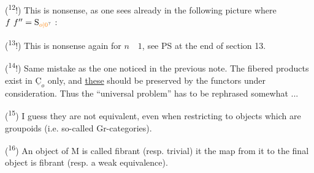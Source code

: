 \noindent\hspace*{1em}\par
\noindent\hspace*{1em}\par
\noindent\hspace*{1em}\par
\noindent\hspace*{1em}\par
\noindent\hspace*{1em}\par
\noindent\hspace*{1em}\par
\noindent\hspace*{1em}\par
\noindent\hspace*{1em}\par
\noindent\hspace*{1em}\par

(\textsuperscript{12}!) This is nonsense, as one sees already in the following picture where $f\ f''=\mathrm{S}_{\unsure{o|0}}$ :

(\textsuperscript{13}!) This is nonsense again for $n\quad 1$, see PS at the end of section 13.

(\textsuperscript{14}!) Same mistake as  the one noticed in the previous note. The fibered products exist in $\underline{\mathrm{C}}_{o}$ only, and \uline{these} should be preserved by the functors under consideration. Thus the ``universal problem'' has to be rephrased somewhat ...

(\textsuperscript{15}) I guess they are not equivalent, even when restricting to objects which are groupoids (i.e. so-called Gr-categories).

(\textsuperscript{16}) An object of $\mathrm{M}$ is called fibrant (resp. trivial) it the map from it to the final object is fibrant (resp. a weak equivalence).

